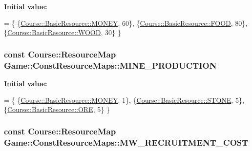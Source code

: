 {\bfseries Initial value\-:}
\begin{DoxyCode}
= \{
    \{\hyperlink{namespaceCourse_a02d49c04029594d4adba79b84bb85f65aff016add6bbbdbb44abf1d2d7f215ec0}{Course::BasicResource::MONEY}, 60\},
    \{\hyperlink{namespaceCourse_a02d49c04029594d4adba79b84bb85f65a7018c47af38bfc1390a89e70b4cf4760}{Course::BasicResource::FOOD}, 80\},
    \{\hyperlink{namespaceCourse_a02d49c04029594d4adba79b84bb85f65a87287be3009253b983ffb2e9f91eef22}{Course::BasicResource::WOOD}, 30\}
\}
\end{DoxyCode}
\hypertarget{namespaceGame_1_1ConstResourceMaps_ad58736a7028bf9bdd46583af4cb3d410}{
\subsubsection[{M\-I\-N\-E\-\_\-\-P\-R\-O\-D\-U\-C\-T\-I\-O\-N}]{\setlength{\rightskip}{0pt plus 5cm}const {\bf Course\-::\-Resource\-Map} Game\-::\-Const\-Resource\-Maps\-::\-M\-I\-N\-E\-\_\-\-P\-R\-O\-D\-U\-C\-T\-I\-O\-N}}\label{namespaceGame_1_1ConstResourceMaps_ad58736a7028bf9bdd46583af4cb3d410}
{\bfseries Initial value\-:}
\begin{DoxyCode}
= \{
    \{\hyperlink{namespaceCourse_a02d49c04029594d4adba79b84bb85f65aff016add6bbbdbb44abf1d2d7f215ec0}{Course::BasicResource::MONEY}, 1\},
    \{\hyperlink{namespaceCourse_a02d49c04029594d4adba79b84bb85f65a8598c3079c2be7785410e724cc190229}{Course::BasicResource::STONE}, 5\},
    \{\hyperlink{namespaceCourse_a02d49c04029594d4adba79b84bb85f65af416a215c7dad21349df38d35be0a1e1}{Course::BasicResource::ORE}, 5\}
\}
\end{DoxyCode}
\hypertarget{namespaceGame_1_1ConstResourceMaps_ad5d316811f8c8442f6c24b5dc9134a87}{
\subsubsection[{M\-W\-\_\-\-R\-E\-C\-R\-U\-I\-T\-M\-E\-N\-T\-\_\-\-C\-O\-S\-T}]{\setlength{\rightskip}{0pt plus 5cm}const {\bf Course\-::\-Resource\-Map} Game\-::\-Const\-Resource\-Maps\-::\-M\-W\-\_\-\-R\-E\-C\-R\-U\-I\-T\-M\-E\-N\-T\-\_\-\-C\-O\-S\-T}}\label{namespaceGame_1_1ConstResourceMaps_ad5d316811f8c8442f6c24b5dc9134a87}
